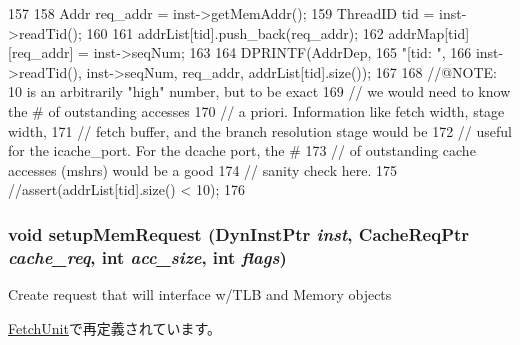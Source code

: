 \begin{DoxyCode}
157 {
158     Addr req_addr = inst->getMemAddr();
159     ThreadID tid = inst->readTid();
160 
161     addrList[tid].push_back(req_addr);
162     addrMap[tid][req_addr] = inst->seqNum;
163 
164     DPRINTF(AddrDep,
165             "[tid:%
      ",
166             inst->readTid(), inst->seqNum, req_addr, addrList[tid].size());
167 
168     //@NOTE: 10 is an arbitrarily "high" number, but to be exact
169     //       we would need to know the # of outstanding accesses
170     //       a priori. Information like fetch width, stage width,
171     //       fetch buffer, and the branch resolution stage would be
172     //       useful for the icache_port. For the dcache port, the #
173     //       of outstanding cache accesses (mshrs) would be a good
174     //       sanity check here.
175     //assert(addrList[tid].size() < 10);
176 }
\end{DoxyCode}
\hypertarget{classCacheUnit_aa942d730ea26d41b72db771cc951f51e}{
\subsubsection[{setupMemRequest}]{\setlength{\rightskip}{0pt plus 5cm}void setupMemRequest ({\bf DynInstPtr} {\em inst}, \/  {\bf CacheReqPtr} {\em cache\_\-req}, \/  int {\em acc\_\-size}, \/  int {\em flags})}}
\label{classCacheUnit_aa942d730ea26d41b72db771cc951f51e}
Create request that will interface w/TLB and Memory objects 

\hyperlink{classFetchUnit_aa942d730ea26d41b72db771cc951f51e}{FetchUnit}で再定義されています。


